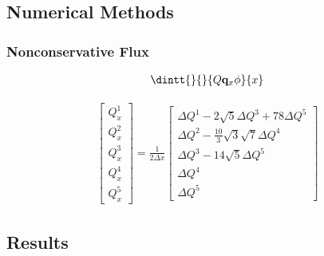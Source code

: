 \documentclass[10pt]{beamer}
\begin{document}
    \subsection{Numerical Methods}
      \begin{frame}
        \frametitle{Nonconservative Flux}

        \begin{gather*}
          \dintt{}{}{Q \v{q}_x \phi}{x}
        \end{gather*}

        \begin{gather*}
          \begin{bmatrix}
            Q_x^1 \\
            Q_x^2 \\
            Q_x^3 \\
            Q_x^4 \\
            Q_x^5
          \end{bmatrix}
          = \frac{1}{2\Delta x}
          \begin{bmatrix}
            \Delta Q^1 - 2\sqrt{5} \Delta Q^3 + 78 \Delta Q^5 \\
            \Delta Q^2 - \frac{10}{3} \sqrt{3} \sqrt{7} \Delta Q^4 \\
            \Delta Q^3 - 14 \sqrt{5} \Delta Q^5 \\
            \Delta Q^4 \\
            \Delta Q^5
          \end{bmatrix}
        \end{gather*}

      \end{frame}

    \subsection{Results}
      \begin{frame}
        \frametitle{}



      \end{frame}
\end{document}
